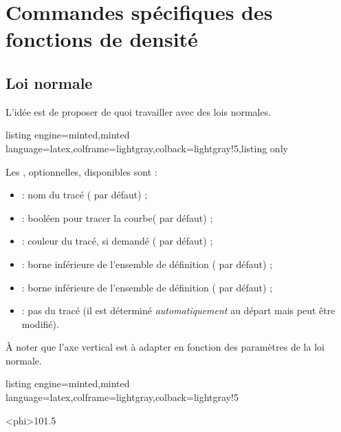 \documentclass[11pt,a4paper]{ltxdoc}
\begin{document}
\pagebreak

\section{Commandes spécifiques des fonctions de densité}

\subsection{Loi normale}\label{loinormale}

L'idée est de proposer de quoi travailler avec des lois normales.

\begin{tcblisting}{listing engine=minted,minted language=latex,colframe=lightgray,colback=lightgray!5,listing only}
\end{tcblisting}

Les \MontreCode{[clés]}, optionnelles, disponibles sont :

\smallskip

\begin{itemize}
	\item {} : nom du tracé ( par défaut) ;
	\item {} : booléen pour tracer la courbe( par défaut) ;
	\item {} : couleur du tracé, si demandé ( par défaut) ;
	\item {} : borne inférieure de l'ensemble de définition ( par défaut) ;
	\item {} : borne inférieure de l'ensemble de définition ( par défaut) ;
	\item {} : pas du tracé (il est déterminé \textit{automatiquement} au départ mais peut être modifié).
\end{itemize}

À noter que l'axe vertical est à adapter en fonction des paramètres de la loi normale.

\begin{tcblisting}{listing engine=minted,minted language=latex,colframe=lightgray,colback=lightgray!5}
\begin{GraphiqueTikz}%
		[x=1.25cm,y=15cm,Origx=5,Xmin=5,Xmax=15,Ymin=0,Ymax=0.3,
		Ygrille=0.1,Ygrilles=0.05]
	\DefinirLoiNormale[Nom=gaussienne]<phi>{10}{1.5}
\end{GraphiqueTikz}
\end{tcblisting}
\end{document}
